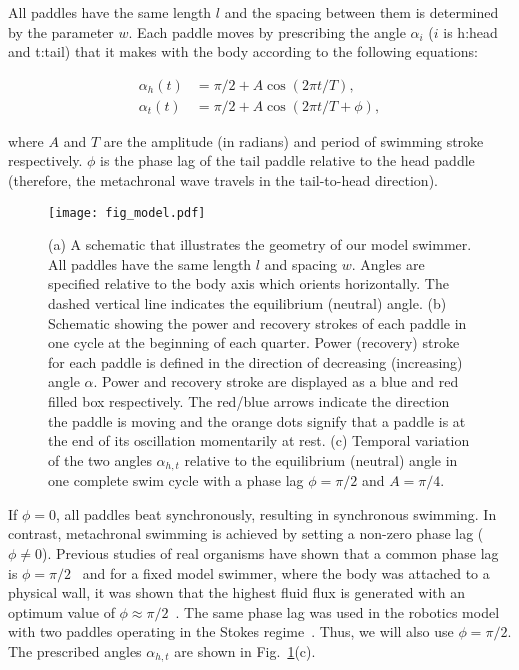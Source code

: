 \documentclass[%
 onecolumn,
superscriptaddress,
 amsmath,amssymb,
 aps,
longbibliography
]{revtex4-2}
\begin{document}
All paddles have the same length $l$ and the spacing between them is determined by the parameter $w$. Each paddle moves by prescribing the angle $\alpha_{i}$  ($i$ is h:head and t:tail) that it makes with the body according to the following equations:

\begin{equation}
\begin{aligned}
\alpha_h(t) & = \pi/2 + A \cos(2\pi t /T ), \\
\alpha_t(t) & = \pi/2 + A \cos(2\pi t /T + \phi)
,
\end{aligned}
\label{eq:alphaJ}
\end{equation}

\noindent where $A$ and $T$ are the amplitude (in radians) and period of swimming stroke respectively. $\phi$ is the phase lag of the tail paddle relative to the head paddle (therefore, the metachronal wave travels in the tail-to-head direction). 

  
\begin{figure}
\texttt{[image: fig\_model.pdf]}
\caption{(a) A schematic that illustrates the geometry of our model swimmer. All paddles have the same length $l$ and spacing $w$. Angles are specified relative to the body axis which orients horizontally. The dashed vertical line indicates the equilibrium (neutral) angle. (b) Schematic showing the power and recovery strokes of each paddle in one cycle at the beginning of each quarter. Power (recovery) stroke for each paddle is defined in the direction of  decreasing (increasing) angle $\alpha$. Power and recovery stroke are displayed as a blue and red filled box respectively. The red/blue arrows indicate the direction the paddle is moving and the orange dots signify that a paddle is at the end of its oscillation momentarily at rest. (c) Temporal variation of the two angles $\alpha_{h,t}$ relative to the equilibrium (neutral) angle in one complete swim cycle with a phase lag $\phi = \pi/2$ and $A = \pi / 4$.}
\label{fig:model}
\end{figure}

If $\phi = 0$, all paddles beat synchronously, resulting in synchronous swimming. In contrast, metachronal swimming is achieved by setting a non-zero phase lag ($\phi \ne 0$). Previous studies of real organisms have shown that a common phase lag is $\phi= \pi / 2$~\cite{Murphy2011Metachronal} and for a fixed model swimmer, where the body was attached to a physical wall, it was shown that the highest fluid flux is generated with an optimum value of $\phi \approx \pi/2$~\cite{Granzier-nakajima2020ANumerical}.
The same phase lag was used in the robotics model with two paddles operating in the Stokes regime~\cite{ Hayashi2020Metachronal}.
Thus, we will also use  $\phi= \pi / 2$. The prescribed angles $\alpha_{h,t}$ are shown in Fig.~\ref{fig:model}(c).
\end{document}
